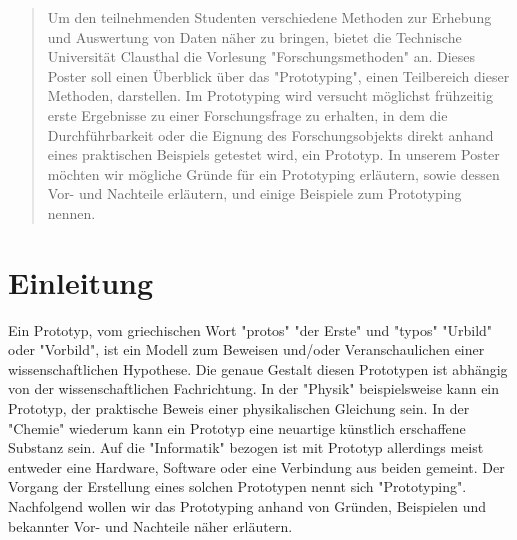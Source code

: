 \documentclass[a0,portrait]{a0poster}
\begin{document}
\begin{multicols}{2} %


\color{Green} %

\begin{abstract}
Um den teilnehmenden Studenten verschiedene Methoden zur Erhebung und Auswertung von Daten näher zu bringen, bietet die Technische Universität Clausthal die Vorlesung "Forschungsmethoden" an. Dieses Poster soll einen Überblick über das "Prototyping", einen Teilbereich dieser Methoden, darstellen. Im Prototyping wird versucht möglichst frühzeitig erste Ergebnisse zu einer Forschungsfrage zu erhalten, in dem die Durchführbarkeit oder die Eignung des Forschungsobjekts direkt anhand eines praktischen Beispiels getestet wird, ein Prototyp.
In unserem Poster möchten wir mögliche Gründe für ein Prototyping erläutern, sowie dessen Vor- und Nachteile erläutern, und einige Beispiele zum Prototyping nennen.
\end{abstract}


\color{Black} %

\section*{Einleitung}
Ein Prototyp, vom griechischen Wort "protos" "der Erste" und "typos" "Urbild" oder "Vorbild", ist ein Modell zum Beweisen und/oder Veranschaulichen einer wissenschaftlichen Hypothese. Die genaue Gestalt diesen Prototypen ist abhängig von der wissenschaftlichen Fachrichtung. In der "Physik" beispielsweise kann ein Prototyp, der praktische Beweis einer physikalischen Gleichung sein. In der "Chemie" wiederum kann ein Prototyp eine neuartige künstlich erschaffene Substanz sein. Auf die "Informatik" bezogen ist mit Prototyp allerdings meist entweder eine Hardware, Software oder eine Verbindung aus beiden gemeint. Der Vorgang der Erstellung eines solchen Prototypen nennt sich "Prototyping". Nachfolgend wollen wir das Prototyping anhand von Gründen, Beispielen und bekannter Vor- und Nachteile näher erläutern.


\end{multicols}
\end{document}
